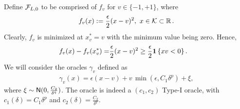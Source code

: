 Define $\mathcal{F}_{L,0}$ to be comprised of $f_v$ for $v \in \{-1,+1\}$, where
\begin{align*}
  f_v(x) := \dfrac{\epsilon}{2} (x - v)^2, \,\, x \in \mathcal{K} \subset \mathbb{R}\,.
\end{align*}
Clearly, $f_v$ is minimized at $x^*_v = v$ with the minimum value being zero.
Hence,
\begin{align}
  f_v(x) - f_v(x^*_v)
  = &  \dfrac{\epsilon}{2} (x - v)^2 \ge  \dfrac{\epsilon}{2}  \mathbf{1}\left\{x v  < 0\right\}. \label{eq:main:fv-lb-main}
\end{align}
We will consider the oracles $\gamma_v$ defined as 
\begin{align}
 \gamma_v(x) = \epsilon(x-v) + v\, \min(\epsilon,C_1 \delta^p) + \xi, \label{eq:main:oracle-1d}
\end{align}
where $\xi \sim \mathsf{N}(0,\frac{C_2}{\delta^q})$.
The oracle is indeed a $(c_1,c_2)$ Type-I oracle, with $c_1(\delta)=C_1\delta^p$ and $c_2(\delta)=\frac{C_2}{\delta^q}$.

